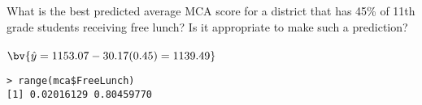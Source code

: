 \documentclass{article}
\begin{document}
\begin{flushleft}
\begin{enumalpha}
\item What is the best predicted average MCA score for a district that has 45\% of 11th grade students receiving free lunch? Is it appropriate to make such a prediction?\\
\medskip
{}\\
$\bv{ \hat y = 1153.07 - 30.17 (0.45) = 1139.49}$\\
\medskip
\begin{verbatim}
> range(mca$FreeLunch)
[1] 0.02016129 0.80459770
\end{verbatim}
\end{enumalpha}


\end{flushleft}
\end{document}
